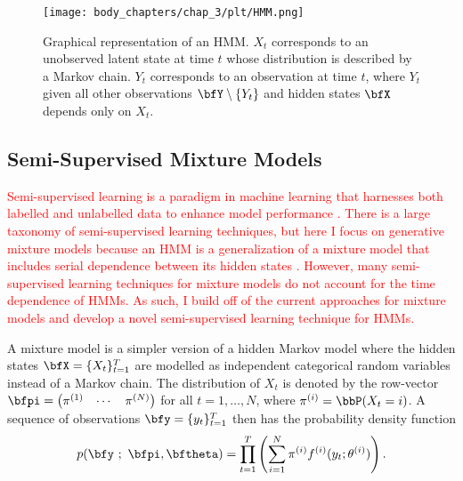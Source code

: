 \begin{figure}%
    \centering
    \texttt{[image: body\_chapters/chap\_3/plt/HMM.png]}
    \caption[Graphical representation of an HMM.]{Graphical representation of an HMM. $X_t$ corresponds to an unobserved latent state at time $t$ whose distribution is described by a Markov chain. $Y_t$ corresponds to an observation at time $t$, where $Y_t$ given all other observations $\bfY \setminus \{Y_t\}$ and hidden states $\bfX$ depends only on $X_t$.}
    \label{fig:chp3_HMM}
\end{figure}

\subsection{Semi-Supervised Mixture Models}
\label{sec:chp3_2_2}

\textcolor{red}{Semi-supervised learning is a paradigm in machine learning that harnesses both labelled and unlabelled data to enhance model performance \citep{Chapelle:2006}. There is a large taxonomy of semi-supervised learning techniques, but here I focus on generative mixture models because an HMM is a generalization of a mixture model that includes serial dependence between its hidden states \citep{Nigam:2000, vanEngelen:2020}. However, many semi-supervised learning techniques for mixture models do not account for the time dependence of HMMs. As such, I build off of the current approaches for mixture models and develop a novel semi-supervised learning technique for HMMs.}

A mixture model is a simpler version of a hidden Markov model where the hidden states $\bfX = \{X_t\}_{t=1}^T$ are modelled as independent categorical random variables instead of a Markov chain. The distribution of $X_t$ is denoted by the row-vector $\bfpi = \begin{pmatrix} \pi^{(1)} & \cdots & \pi^{(N)} \end{pmatrix}$ for all $t = 1, \ldots, N$, where $\pi^{(i)} = \bbP(X_t = i)$. A sequence of observations $\bfy = \{y_t\}_{t=1}^T$ then has the probability density function
%
\begin{equation}
    p(\bfy ~;~ \bfpi,\bftheta) = \prod_{t=1}^T \left(\sum_{i = 1}^N \pi^{(i)} f^{(i)}(y_t; \theta^{(i)}) \right). 
    \label{eqn:chp3_like_marginal}
\end{equation}

